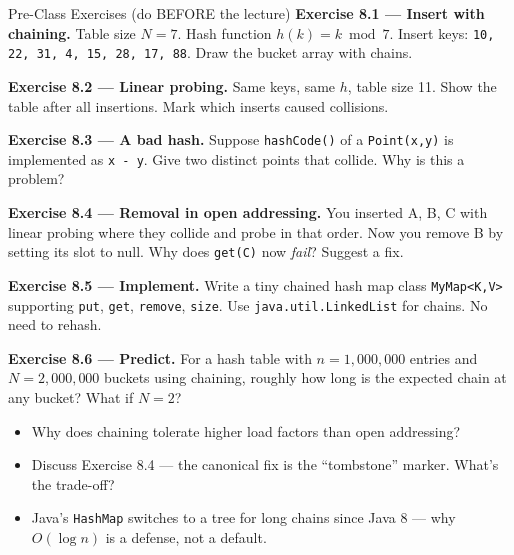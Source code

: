 \documentclass[11pt]{article}
\begin{document}
\begin{exbox}{Pre-Class Exercises (do BEFORE the lecture)}
\textbf{Exercise 8.1 --- Insert with chaining.} Table size $N = 7$. Hash function $h(k) = k \bmod 7$. Insert keys: \verb|10, 22, 31, 4, 15, 28, 17, 88|. Draw the bucket array with chains.

\textbf{Exercise 8.2 --- Linear probing.} Same keys, same $h$, table size 11. Show the table after all insertions. Mark which inserts caused collisions.

\textbf{Exercise 8.3 --- A bad hash.} Suppose \verb|hashCode()| of a \texttt{Point(x,y)} is implemented as \verb|x - y|. Give two distinct points that collide. Why is this a problem?

\textbf{Exercise 8.4 --- Removal in open addressing.} You inserted A, B, C with linear probing where they collide and probe in that order. Now you remove B by setting its slot to null. Why does \texttt{get(C)} now \emph{fail}? Suggest a fix.

\textbf{Exercise 8.5 --- Implement.} Write a tiny chained hash map class \verb|MyMap<K,V>| supporting \verb|put|, \verb|get|, \verb|remove|, \verb|size|. Use \verb|java.util.LinkedList| for chains. No need to rehash.

\textbf{Exercise 8.6 --- Predict.} For a hash table with $n=1{,}000{,}000$ entries and $N=2{,}000{,}000$ buckets using chaining, roughly how long is the expected chain at any bucket? What if $N=2$?
\end{exbox}

\begin{disbox}
\begin{itemize}[leftmargin=*]
  \item Why does chaining tolerate higher load factors than open addressing?
  \item Discuss Exercise 8.4 --- the canonical fix is the ``tombstone'' marker. What's the trade-off?
  \item Java's \texttt{HashMap} switches to a tree for long chains since Java 8 --- why $O(\log n)$ is a defense, not a default.
\end{itemize}
\end{disbox}
\end{document}
